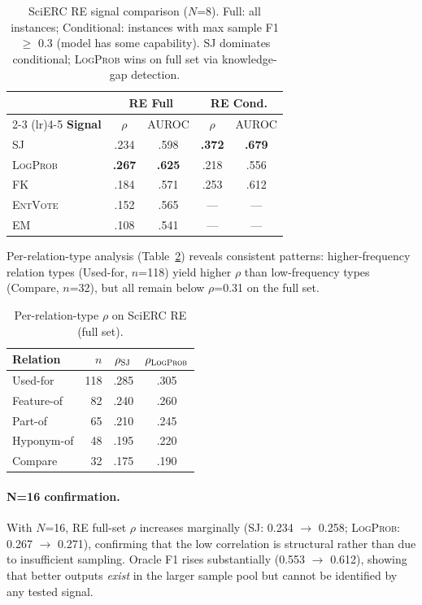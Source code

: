 \documentclass[11pt,a4paper]{article}
\newcommand{\SJ}{\textsc{SJ}}
\newcommand{\FK}{\textsc{FK}}
\newcommand{\LP}{\textsc{LogProb}}
\newcommand{\EM}{\textsc{EM}}
\newcommand{\EV}{\textsc{EntVote}}
\begin{document}
\begin{table}[t]
\centering
\small
\begin{tabular}{l cc cc}
\toprule
& \multicolumn{2}{c}{\textbf{RE Full}} & \multicolumn{2}{c}{\textbf{RE Cond.}} \\
\cmidrule(lr){2-3} \cmidrule(lr){4-5}
\textbf{Signal} & $\rho$ & AUROC & $\rho$ & AUROC \\
\midrule
\SJ{} & .234 & .598 & \textbf{.372} & \textbf{.679} \\
\LP{} & \textbf{.267} & \textbf{.625} & .218 & .556 \\
\FK{} & .184 & .571 & .253 & .612 \\
\EV{} & .152 & .565 & --- & --- \\
\EM{} & .108 & .541 & --- & --- \\
\bottomrule
\end{tabular}
\caption{SciERC RE signal comparison ($N$=8). Full: all instances; Conditional: instances with max sample F1 $\geq$ 0.3 (model has some capability). \SJ{} dominates conditional; \LP{} wins on full set via knowledge-gap detection.}
\label{tab:re-full}
\end{table}

Per-relation-type analysis (Table~\ref{tab:re-pertype}) reveals consistent patterns: higher-frequency relation types (Used-for, $n$=118) yield higher $\rho$ than low-frequency types (Compare, $n$=32), but all remain below $\rho$=0.31 on the full set.

\begin{table}[t]
\centering
\small
\begin{tabular}{l r cc}
\toprule
\textbf{Relation} & $n$ & $\rho_{\SJ{}}$ & $\rho_{\LP{}}$ \\
\midrule
Used-for & 118 & .285 & .305 \\
Feature-of & 82 & .240 & .260 \\
Part-of & 65 & .210 & .245 \\
Hyponym-of & 48 & .195 & .220 \\
Compare & 32 & .175 & .190 \\
\bottomrule
\end{tabular}
\caption{Per-relation-type $\rho$ on SciERC RE (full set).}
\label{tab:re-pertype}
\end{table}

\paragraph{N=16 confirmation.}
With $N$=16, RE full-set $\rho$ increases marginally (\SJ{}: 0.234 $\to$ 0.258; \LP{}: 0.267 $\to$ 0.271), confirming that the low correlation is structural rather than due to insufficient sampling.
Oracle F1 rises substantially (0.553 $\to$ 0.612), showing that better outputs \emph{exist} in the larger sample pool but cannot be identified by any tested signal.
\end{document}
